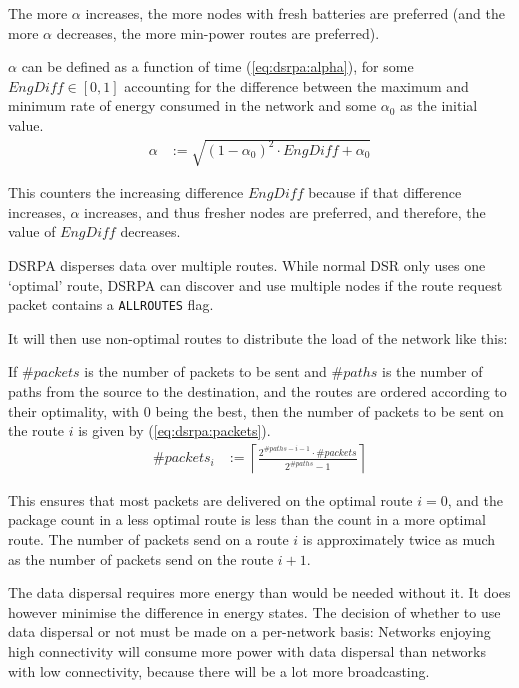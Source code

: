 The more $\alpha$ increases, the more nodes with fresh batteries are preferred
(and the more $\alpha$ decreases, the more min-power routes are preferred).

$\alpha$ can be defined as a function of time (\ref{eq:dsrpa:alpha}),
for some $EngDiff \in [0,1]$ accounting for the difference between the maximum and minimum rate
of energy consumed in the network and some $\alpha_{0}$ as the initial value.
\begin{align}
    \alpha &:= \sqrt{(1-\alpha_{0})^{2} \cdot EngDiff + \alpha_{0}}
    \label{eq:dsrpa:alpha}
\end{align}

This counters the increasing difference $EngDiff$ because if that
difference increases, $\alpha$ increases, and thus fresher nodes are preferred,
and therefore, the value of $EngDiff$ decreases.

DSRPA disperses data over multiple routes.  While normal DSR only uses one
`optimal' route, DSRPA can discover and use multiple nodes if the route request
packet contains a \texttt{ALLROUTES} flag.

It will then use non-optimal routes to distribute the load of the network like
this:

If $\#packets$ is the number of packets to be sent and
$\#paths$ is the number of paths from the source to the
destination, and the routes are ordered according to their optimality,
with 0 being the best, then the number of packets to be sent on the route $i$
is given by (\ref{eq:dsrpa:packets}).
\begin{align}
     \#packets_{i} &:= \left\lceil \frac{2^{\# paths - i - 1} \cdot \# packets}{2^{\#paths} - 1} \right\rceil
     \label{eq:dsrpa:packets}
\end{align}

This ensures that most packets are delivered on the optimal route $i=0$, and
the package count in a less optimal route is less than the count in a more
optimal route. The number of packets send on a route $i$ is approximately
twice as much as the number of packets send on the route $i+1$.

The data dispersal requires more energy than would be needed without it. It
does however minimise the difference in energy states. The decision of whether
to use data dispersal or not must be made on a per-network basis: Networks
enjoying high connectivity will consume more power with data dispersal than
networks with low connectivity, because there will be a lot more broadcasting.
